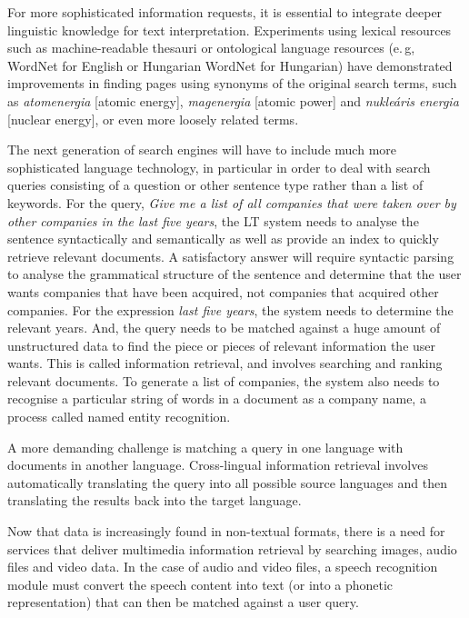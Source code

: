 \begin{multicols}{2}

For more sophisticated information requests, it is essential to integrate deeper linguistic knowledge for text interpretation. Experiments using lexical resources such as machine-readable thesauri or ontological language resources (e.\,g, WordNet for English or Hungarian WordNet for Hungarian) have demonstrated improvements in finding pages using synonyms of the original search terms, such as \textit{atomenergia} [atomic energy], \textit{magenergia} [atomic power] and \textit{nukleáris energia} [nuclear energy], or even more loosely related terms.

The next generation of search engines will have to include much more sophisticated language technology, in particular in order to deal with search queries consisting of a question or other sentence type rather than a list of keywords. For the query, \textit{Give me a list of all companies that were taken over by other companies in the last five years}, the LT system needs to analyse the sentence syntactically and semantically as well as provide an index to quickly retrieve relevant documents. A satisfactory answer will require syntactic parsing to analyse the grammatical structure of the sentence and determine that the user wants companies that have been acquired, not companies that acquired other companies. For the expression \textit{last five years}, the system needs to determine the relevant years. And, the query needs to be matched against a huge amount of unstructured data to find the piece or pieces of relevant information the user wants. This is called information retrieval, and involves searching and ranking relevant documents. To generate a list of companies, the system also needs to recognise a particular string of words in a document as a company name, a process called named entity recognition.

A more demanding challenge is matching a query in one language with documents in another language. Cross-lingual information retrieval involves automatically translating the query into all possible source languages and then translating the results back into the target language. 

Now that data is increasingly found in non-textual formats, there is a need for services that deliver multimedia information retrieval by searching images, audio files and video data. In the case of audio and video files, a speech recognition module must convert the speech content into text (or into a phonetic representation) that can then be matched against a user query.


\end{multicols}
